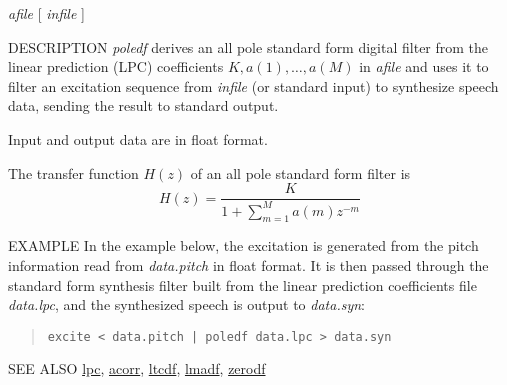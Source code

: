 \begin{synopsis}
\item[poledf] [ --m $M$ ] [ --p $P$ ] [ --i $I$ ] [ --t ] [ --k ]
              {\em afile} [ {\em infile} ]
\end{synopsis}

\begin{qsection}{DESCRIPTION}
{\em poledf} derives an all pole standard form digital filter 
from the linear prediction (LPC) coefficients 
$K,a(1),\dots,a(M)$ in {\em afile} 
and uses it to filter an excitation sequence 
from {\em infile} (or standard input) to synthesize speech data, 
sending the result to standard output.

Input and output data are in float format.

The transfer function $H(z)$ of an all pole standard form
filter is
\begin{displaymath}
H(z) = \frac{K}{\displaystyle 1+\sum_{m=1}^M a(m) z^{-m}}
\end{displaymath}
\end{qsection}

\begin{options}
\end{options}

\begin{qsection}{EXAMPLE}
In the example below, the excitation is generated
from the pitch information read from {\em data.pitch} in
float format. It is then passed through the standard form synthesis
filter built from the linear prediction coefficients file
{\em data.lpc}, and the synthesized speech is output to
{\em data.syn}:
\begin{quote}
  \verb!excite < data.pitch | poledf data.lpc > data.syn!
\end{quote}
\end{qsection}

\begin{qsection}{SEE ALSO}
\hyperlink{lpc}{lpc},
\hyperlink{acorr}{acorr},
\hyperlink{ltcdf}{ltcdf},
\hyperlink{lmadf}{lmadf},
\hyperlink{zerodf}{zerodf}
\end{qsection}
